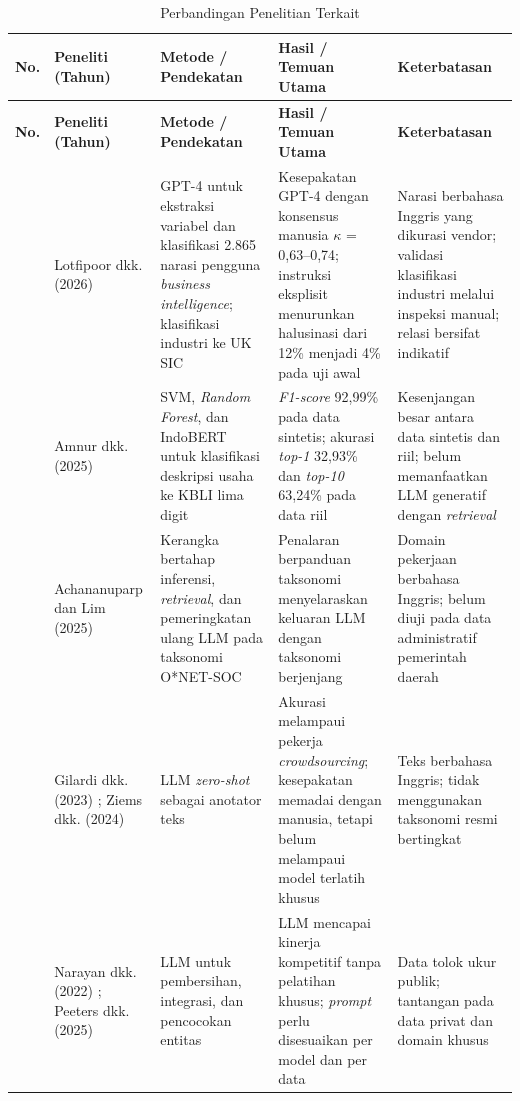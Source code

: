\documentclass[12pt,a4paper]{report}
\begin{document}
{\footnotesize
\setlength{\tabcolsep}{4pt}
\renewcommand{\arraystretch}{1.15}
\begin{longtable}{|>{\centering\arraybackslash}p{}|L{0.16\textwidth}|L{0.21\textwidth}|L{0.24\textwidth}|L{0.23\textwidth}|}
\caption{Perbandingan Penelitian Terkait}
\label{tab:related_work}\\
\hline
\textbf{No.} & \textbf{Peneliti (Tahun)} & \textbf{Metode / Pendekatan} & \textbf{Hasil / Temuan Utama} & \textbf{Keterbatasan} \\ \hline
\endfirsthead
\hline
\textbf{No.} & \textbf{Peneliti (Tahun)} & \textbf{Metode / Pendekatan} & \textbf{Hasil / Temuan Utama} & \textbf{Keterbatasan} \\ \hline
{} & Lotfipoor dkk. (2026) \cite{lotfipoor2026llm} & GPT-4 untuk ekstraksi variabel dan klasifikasi 2.865 narasi pengguna \textit{business intelligence}; klasifikasi industri ke UK SIC & Kesepakatan GPT-4 dengan konsensus manusia $\kappa$ = 0,63--0,74; instruksi eksplisit menurunkan halusinasi dari 12\% menjadi 4\% pada uji awal & Narasi berbahasa Inggris yang dikurasi vendor; validasi klasifikasi industri melalui inspeksi manual; relasi bersifat indikatif \\  & Amnur dkk. (2025) \cite{amnur2025kbli} & SVM, \textit{Random Forest}, dan IndoBERT untuk klasifikasi deskripsi usaha ke KBLI lima digit & \textit{F1-score} 92,99\% pada data sintetis; akurasi \textit{top-1} 32,93\% dan \textit{top-10} 63,24\% pada data riil & Kesenjangan besar antara data sintetis dan riil; belum memanfaatkan LLM generatif dengan \textit{retrieval} \\  & Achananuparp dan Lim (2025) \cite{achananuparp2025occupation} & Kerangka bertahap inferensi, \textit{retrieval}, dan pemeringkatan ulang LLM pada taksonomi O*NET-SOC & Penalaran berpanduan taksonomi menyelaraskan keluaran LLM dengan taksonomi berjenjang & Domain pekerjaan berbahasa Inggris; belum diuji pada data administratif pemerintah daerah \\  & Gilardi dkk. (2023) \cite{gilardi2023chatgpt}; Ziems dkk. (2024) \cite{ziems2024css} & LLM \textit{zero-shot} sebagai anotator teks & Akurasi melampaui pekerja \textit{crowdsourcing}; kesepakatan memadai dengan manusia, tetapi belum melampaui model terlatih khusus & Teks berbahasa Inggris; tidak menggunakan taksonomi resmi bertingkat \\  & Narayan dkk. (2022) \cite{narayan2022wrangle}; Peeters dkk. (2025) \cite{peeters2025entity} & LLM untuk pembersihan, integrasi, dan pencocokan entitas & LLM mencapai kinerja kompetitif tanpa pelatihan khusus; \textit{prompt} perlu disesuaikan per model dan per data & Data tolok ukur publik; tantangan pada data privat dan domain khusus \\ \hline

\end{longtable}}
\end{document}
